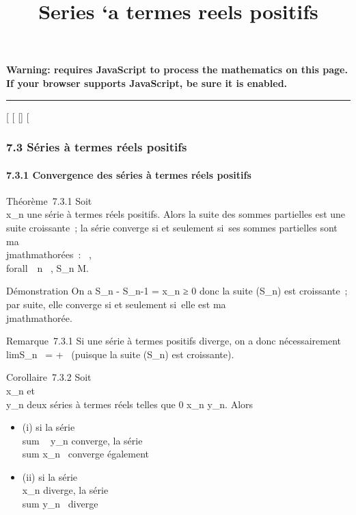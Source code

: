 \documentclass[]{article}
\title{Series `a termes reels positifs}
\author{}
\date{}
\begin{document}
\maketitle

\textbf{Warning: 
requires JavaScript to process the mathematics on this page.\\ If your
browser supports JavaScript, be sure it is enabled.}

\begin{center}\rule{3in}{0.4pt}\end{center}

{[}
{[}
{[}{]}
{[}

\subsubsection{7.3 Séries à termes réels positifs}

\paragraph{7.3.1 Convergence des séries à termes réels positifs}

Théorème~7.3.1 Soit \\\sum
 x_n une série à termes réels positifs. Alors la suite des
sommes partielles est une suite croissante~; la série converge si et
seulement si~ses sommes partielles sont ma\\jmathmathorées~:
\existsM \in {}~, \\forall~~n \in {}~,
S_n \leq M.

Démonstration On a S_n - S_n-1 = x_n ≥ 0 donc
la suite (S_n) est croissante~; par suite, elle converge si et
seulement si~elle est ma\\jmathmathorée.

Remarque~7.3.1 Si une série à termes positifs diverge, on a donc
nécessairement limS_n~ = +\infty~ (puisque
la suite (S_n) est croissante).

Corollaire~7.3.2 Soit \\\sum
 x_n et \\\sum
 y_n deux séries à termes réels telles que 0 \leq x_n
\leq y_n. Alors

\begin{itemize}
\itemsep1pt\parskip0pt
\item
  (i) si la série \\sum ~
  y_n converge, la série
  \\sum  x_n~
  converge également
\item
  (ii) si la série \\\sum
   x_n diverge, la série
  \\sum  y_n~
  diverge
\end{itemize}
\end{document}
